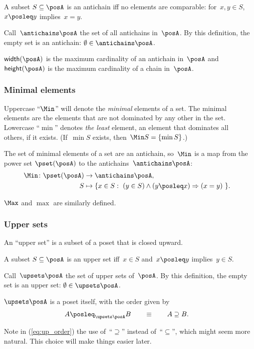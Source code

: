 \begin{defn}[Antichains]
A subset $S\subseteq\posA$ is an antichain iff no elements are comparable:
for~$x,y\in S$, $x\posleq y$ implies~$x=y$. 
\end{defn}
Call~$\antichains\posA$ the set of all antichains in~$\posA$.
By this definition, the empty set is an antichain: $\emptyset\in\antichains\posA$.

\begin{defn}
\label{def:poset-width-height} $\mathsf{width}(\posA)$ is the maximum
cardinality of an antichain in~$\posA$ and $\mathsf{height}(\posA)$
is the maximum cardinality of a chain in~$\posA$.
\end{defn}


\subsubsection*{Minimal elements}

Uppercase ``$\Min$'' will denote the \emph{minimal} elements of
a set. The minimal elements are the elements that are not dominated
by any other in the set. Lowercase ``$\min$'' denotes\emph{ the
least} element, an element that dominates all others, if it exists.
(If~$\min S$ exists, then~$\Min S=\{\min S\}$.)   

The set of minimal elements of a set are an antichain, so~$\Min$
is a map from the power set $\pset(\posA)$ to the antichains~$\antichains\posA$:
\begin{align*}
\Min\colon\pset(\posA) & \rightarrow\antichains\posA,\\
S & \mapsto\{x\in S:\ (y\in S)\wedge(y\posleq x)\Rightarrow(x=y)\ \}.
\end{align*}

$\Max$ and $\max$ are similarly defined.

\subsubsection*{Upper sets}

An ``upper set'' is a subset of a poset that is closed upward.

\begin{defn}
A subset $S\subseteq\posA$ is an upper set iff~$x\in S$ and~$x\posleq y$
implies~$y\in S$. 
\end{defn}
Call~$\upsets\posA$ the set of upper sets of~$\posA$. By this
definition, the empty set is an upper set: $\emptyset\in\upsets\posA$.
\begin{lem}
$\upsets\posA$ is a poset itself, with the order given by 
\begin{equation}
A\posleq_{\upsets\posA}B\qquad\equiv\qquad A\supseteq B.\label{eq:up_order}
\end{equation}
\end{lem}
Note in (\ref{eq:up_order}) the use of~``$\supseteq$'' instead
of~``$\subseteq$'', which might seem more natural. This choice
will make things easier later. 

